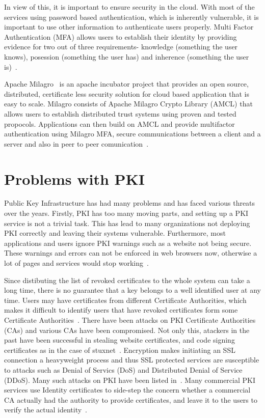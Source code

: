 In view of this, it is important to ensure security in the cloud. With
most of the services using password based authentication, which is
inherently vulnerable, it is important to use other information to
authenticate users properly. Multi Factor Authentication (MFA) allows
users to establish their identity by providing evidence for two out of
three requirements- knowledge (something the user knows), posession
(something the user has) and inherence (something the user
is)~\cite{centrify-mfa}.

Apache Milagro~\cite{milagro-website} is an apache incubator project
that provides an open source, distributed, certificate less security
solution for cloud based application that is easy to scale. Milagro
consists of Apache Milagro Crypto Library (AMCL) that allows users to
establish distributed trust systems using proven and tested
propocols. Applications can then build on AMCL and provide multifactor
authentication using Milagro MFA, secure communications between a
client and a server and also in peer to peer
comunication~\cite{milagro-docs-overview}.



\section{Problems with PKI}
Public Key Infrastructure has had many problems and has faced various
threats over the years.  Firstly, PKI has too many moving parts, and
setting up a PKI service is not a trivial task. This has lead to many
organizations not deploying PKI correctly and leaving their systems
vulnerable. Furthermore, most applications and users ignore PKI
warnings such as a website not being secure. These warnings and errors
can not be enforced in web browsers now, otherwise a lot of pages and
services would stop working~\cite{cso-pki-problems}.

Since distibuting the list of revoked certificates to the whole system
can take a long time, there is no guarantee that a key belongs to a
well identified user at any time. Users may have certificates from
different Certificate Authorities, which makes it difficult to
identify users that have revoked certificates form some Certificate
Authorities~\cite{distlab-pki-problems}.  There have been attacks on
PKI Certificate Authorities (CAs) and various CAs have been
compromised. Not only this, atackers in the past have been successful
in stealing website certificates, and code signing certificates as in
the case of stuxnet~\cite{securityweek-ssl-threats}. Encryption makes
initiating an SSL connection a heavyweight process and thus SSL
protected services are susceptible to attacks such as Denial of
Servics (DoS) and Distributed Denial of Service (DDoS). Many such
attacks on PKI have been listed in~\cite{cacert-wiki-pki-history}.
Many commercial PKI services use Identity certificates to side-step
the concern whether a commercial CA actually had the authority to
provide certificates, and leave it to the users to verify the actual
identity~\cite{ten-pki-risks}.

